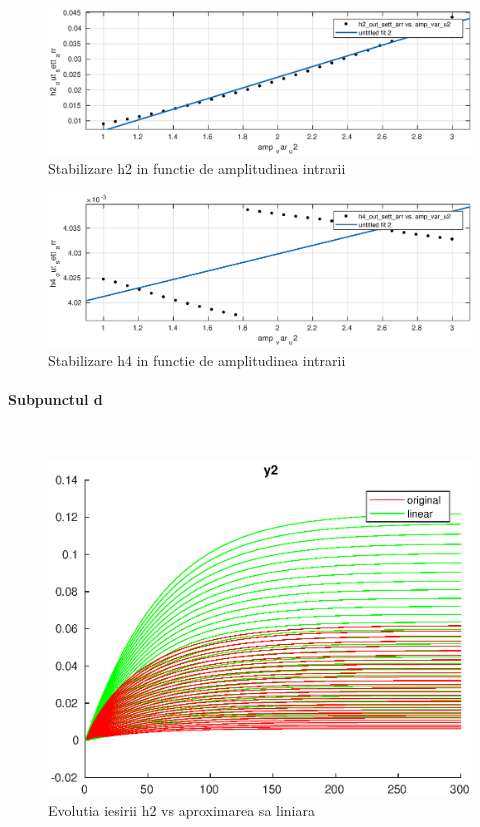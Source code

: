\documentclass[12pt,english]{article}
\newcommand{\myparagraph}[1]{\paragraph{#1}\mbox{}\\}
\begin{document}
\begin{figure} [H]
	\includegraphics[width=1\textwidth]{c_2_1.eps}
	\caption{Stabilizare h2 in functie de amplitudinea intrarii}
\end{figure}

\begin{figure} [H]
	\includegraphics[width=1\textwidth]{c_2_2.eps}
	\caption{Stabilizare h4 in functie de amplitudinea intrarii}
\end{figure}

\myparagraph {Subpunctul d}

\begin{figure} [H]
	\includegraphics[width=1\textwidth]{d_1.eps}
	\caption{Evolutia iesirii h2 vs aproximarea sa liniara}
\end{figure}
\end{document}
